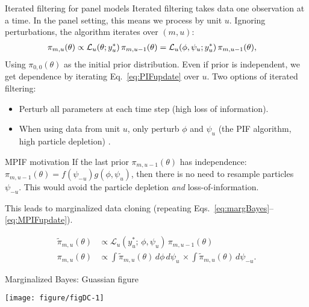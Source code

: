 \documentclass[aspectratio=169]{beamer}\usepackage[]{graphicx}\usepackage[]{xcolor}
\makeatletter
\def\maxwidth{ %
  \ifdim\Gin@nat@width>\linewidth
    \linewidth
  \else
    \Gin@nat@width
  \fi
}
\newenvironment{knitrout}{}{} %
\makeatother
\begin{document}
\begin{frame}{Iterated filtering for panel models}
  Iterated filtering takes data one observation at a time. In the panel setting, this means we process by unit $u$. Ignoring perturbations, the algorithm iterates over $(m, u)$: 
  \begin{align}
    \pi_{m, u}(\theta) &\propto \mathcal{L}_u(\theta; y_u^*)\, \pi_{m, u-1}(\theta) = \mathcal{L}_u(\phi, \psi_u; y_u^*)\, \pi_{m, u-1}(\theta), \label{eq:PIFupdate}
  \end{align}
    Using $\pi_{0, 0}(\theta)$ as the initial prior distribution. Even if prior is independent, we get dependence by iterating Eq.~\ref{eq:PIFupdate} over $u$. Two options of iterated filtering: 
    \begin{itemize}
      \item Perturb all parameters at each time step (high loss of information). 
      \item When using data from unit $u$, only perturb $\phi$ and $\psi_u$ (the PIF algorithm, high particle depletion) \citep{breto20}. 
    \end{itemize}
\end{frame}

\begin{frame}{MPIF motivation}
  If the last prior $\pi_{m, u-1}(\theta)$ has independence: $\pi_{m, u-1}(\theta) = f(\psi_{-u})g(\phi, \psi_{u})$, then there is no need to resample particles $\psi_{-u}$. This would avoid the particle depletion \emph{and} loss-of-information.
  
  This leads to marginalized data cloning (repeating Eqs.~\ref{eq:margBayes}--\ref{eq:MPIFupdate}). 
  
  \begin{align}
\tilde{\pi}_{m, u}(\theta) &\propto \mathcal{L}_{u}(y^*_u;\, \phi, \psi_u)\, \pi_{m, u-1}(\theta) \label{eq:margBayes}\\
\pi_{m, u}(\theta) &\propto \int \! \tilde{\pi}_{m, u}(\theta) \, d\phi \, d\psi_u \, \times \int \! \tilde{\pi}_{m, u}(\theta) \, d\psi_{-u} \label{eq:MPIFupdate}.
\end{align}
\end{frame}

\begin{frame}{Marginalized Bayes: Guassian figure}

\begin{knitrout}
\color{fgcolor}

{\centering \texttt{[image: figure/figDC-1]} 

}


\end{knitrout}

\end{frame}
\end{document}
